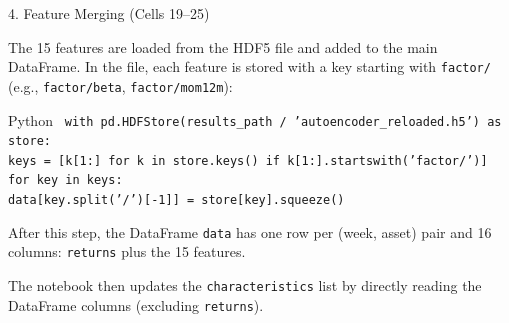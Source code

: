 \documentclass[aspectratio=169, 11pt]{beamer}
\begin{document}
\begin{frame}{4. Feature Merging (Cells 19--25)}

The 15 features are loaded from the HDF5 file and added to the main DataFrame. In the file, each feature is stored with a key starting with \texttt{factor/} (e.g., \texttt{factor/beta}, \texttt{factor/mom12m}):

\vspace{0.3cm}

\begin{block}{Python}
\small
\texttt{
with pd.HDFStore(results\_path / 'autoencoder\_reloaded.h5') as store: \\
\hspace{0.8cm} keys = [k[1:] for k in store.keys() if k[1:].startswith('factor/')] \\
\hspace{0.8cm} for key in keys: \\
\hspace{1.6cm} data[key.split('/')[-1]] = store[key].squeeze()
}
\end{block}

\vspace{0.3cm}

After this step, the DataFrame \texttt{data} has one row per (week, asset) pair and 16 columns: \texttt{returns} plus the 15 features.

\vspace{0.3cm}

The notebook then updates the \texttt{characteristics} list by directly reading the DataFrame columns (excluding \texttt{returns}).

\end{frame}
%
%
\end{document}
